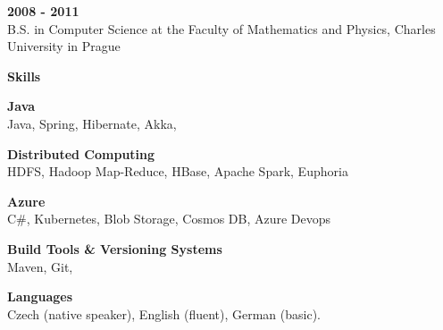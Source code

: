 \documentclass[a4paper,11pt,final,oneside]{memoir}
\newcommand{\Sep}{\vspace{1.4em}}
\newcommand{\SmallSep}{\vspace{0.7em}}
\newcommand{\CVSection}[1]
	{\Large\textbf{#1}\par
	\SmallSep\normalsize\normalfont}
\newcommand{\CVItem}[1]
	{\textbf{\color{RoyalBlue} #1}}
\begin{document}
\CVItem{2008 - 2011}\\
B.S. in Computer Science at the Faculty of Mathematics and Physics, Charles University in Prague
\Sep

\CVSection{Skills}

\CVItem{Java}\\
Java, Spring, Hibernate, Akka,
\SmallSep

\CVItem{Distributed Computing}\\
HDFS, Hadoop Map-Reduce, HBase, Apache Spark, Euphoria
\SmallSep

\CVItem{Azure}\\
C\#, Kubernetes, Blob Storage, Cosmos DB, Azure Devops
\SmallSep

\CVItem{Build Tools \& Versioning Systems}\\
Maven, Git,
\SmallSep 

\CVItem{Languages}\\
Czech (native speaker), English (fluent), German (basic).
\Sep 

\end{document}
